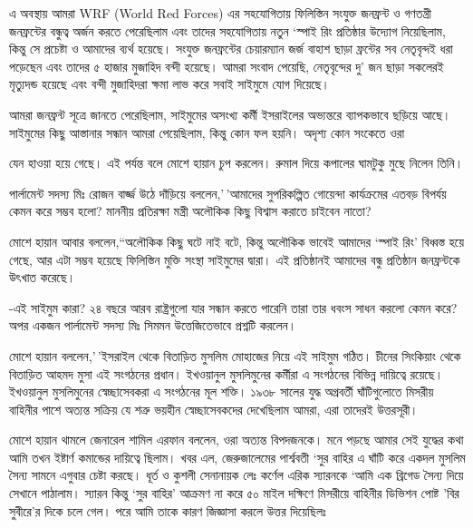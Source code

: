 \documentclass[
]{book}
\begin{document}
এ অবস্থায় আমরা WRF (World Red Forces) এর সহযোগিতায় ফিলিস্তিন সংযুক্ত জনফ্রন্ট ও গণতন্ত্রী জনফ্রন্টের বন্ধুত্ব অর্জন করতে পেরেছিলাম এবং তাদের সহযোগিতায় নতুন `স্পাই রিং প্রতিষ্ঠার উদ্যোগ নিয়েছিলাম, কিন্তু সে প্রচেষ্টা ও আমাদের ব্যর্থ হয়েছে। সংযুক্ত জনফ্রন্টের চেয়ারম্যান জর্জ বাহাশ ছাড়া ফ্রন্টের সব নেতৃবৃন্দই ধরা পড়েছেন এবং তাদের ৫ হাজার মুজাহিদ বন্দী হয়েছে। আমরা সংবাদ পেয়েছি, নেতৃবৃন্দের দু' জন ছাড়া সকলেরই মৃত্যুদন্ড হয়েছে এবং বন্দী মুজাহিদরা ক্ষমা লাভ করে সবাই সাইমুমে যোগ দিয়েছে।

আমরা জনফ্রন্ট সূত্রে জানতে পেরেছিলাম, সাইমুমের অসংখ্য কর্মী ইসরাইলের অভ্যন্তরে ব্যাপকভাবে ছড়িয়ে আছে। সাইমুমের কিছু আস্তানার সন্ধান আমরা পেয়েছিলাম, কিন্তু কোন ফল হয়নি। অদৃশ্য কোন সংকেতে ওরা

যেন হাওয়া হয়ে গেছে। এই পর্যন্ত বলে মোশে হায়ান চুপ করলেন। রুমাল দিয়ে কপালের ঘামটুকু মুছে নিলেন তিনি।

পার্লামেন্ট সদস্য মিঃ রোজন বার্জ্জ উঠে দাঁড়িয়ে বললেন,'\,'আমাদের সুপরিকল্পিত গোয়েন্দা কার্যক্রমের এতবড় বিপর্যয় কেমন করে সম্ভব হলো? মাননীয় প্রতিরক্ষা মন্ত্রী অলৌকিক কিছু বিশ্বাস করাতে চাইবেন নাতো?

মোশে হায়ান আবার বললেন,``অলৌকিক কিছু ঘটে নাই বটে, কিন্তু অলৌকিক ভাবেই আমাদের `স্পাই রিং' বিধ্বস্ত হয়ে গেছে, আর এটা সম্ভব হয়েছে ফিলিস্তিন মুক্তি সংস্থা সাইমুমের দ্বারা। এই প্রতিষ্ঠানই আমাদের বন্ধু প্রতিষ্ঠান জনফ্রন্টকে উৎখাত করেছে।

-এই সাইমুম কারা? ২৪ বছরে আরব রাষ্ট্রগুলো যার সন্ধান করতে পারেনি তারা তার ধবংস সাধন করলো কেমন করে? অপর একজন পার্লামেন্ট সদস্য মিঃ সিমমন উত্তেজিতেভাবে প্রশ্নটি করলেন।

মোশে হায়ান বললেন,'\,'ইসরাইল থেকে বিতাড়িত মুসলিম মোহাজের নিয়ে এই সাইমুম গঠিত। চীনের সিংকিয়াং থেকে বিতাড়িত আহমদ মুসা এই সংগঠনের প্রধান। ইখওয়ানুল মুসলিমুনের কর্মীরা এ সংগঠনের বিভিন্ন দায়িত্বে রয়েছে। ইখওয়ানুল মুসলিমুনের স্বেচ্ছাসেবকরা এ সংগঠনের মূল শক্তি। ১৯৩৮ সালের যুদ্ধ অগ্রবর্তী ঘাঁটিগুলোতে মিসরীয় বাহিনীর পাশে অত্যন্ত সক্রিয় যে শত্রু ভয়হীন স্বেচ্ছাসেবকদের দেখেছিলাম আমরা, এরা তাদেরই উত্তরসূরী।

মোশে হায়ান থামলে জেনারেল শামিল এরফান বললেন, ওরা অত্যন্ত বিপদজনকে। মনে পড়ছে আমার সেই যুদ্ধের কথা আমি তখন ইষ্টার্ণ কমান্ডের দায়িত্বে ছিলাম। খবর এল, জেরুজালেমের পার্শ্ববতী `সুর বাহির এ ঘাঁটি করে একদল মুসলিম সৈন্য সামনে এগুবার চেষ্টা করছে। ধূর্ত ও কুশলী সেনানায়ক লেঃ কর্ণেল এরিক স্যারনকে `আমি এক ব্রিগেড সৈন্য দিয়ে সেখানে পাঠালাম। স্যারন কিন্তু `সুর বাহির' আক্রমণ না করে ৫০ মাইল দক্ষিণে মিসরীয়ে বাহিনীর ডিভিশন পোষ্ট 'বির সুবীরে'র দিকে চলে গেল। পরে আমি তাকে কারণ জিজ্ঞাসা করলে উত্তর দিয়েছিলঃ
\end{document}
